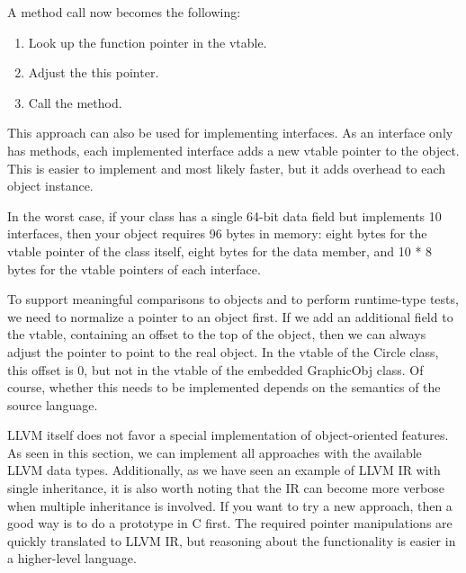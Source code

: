 
A method call now becomes the following:

\begin{enumerate}
\item
Look up the function pointer in the vtable.

\item
Adjust the this pointer.

\item
Call the method.
\end{enumerate}

This approach can also be used for implementing interfaces. As an interface only has methods, each implemented interface adds a new vtable pointer to the object. This is easier to implement and most likely faster, but it adds overhead to each object instance.

In the worst case, if your class has a single 64-bit data field but implements 10 interfaces, then your object requires 96 bytes in memory: eight bytes for the vtable pointer of the class itself, eight bytes for the data member, and 10 * 8 bytes for the vtable pointers of each interface.

To support meaningful comparisons to objects and to perform runtime-type tests, we need to normalize a pointer to an object first. If we add an additional field to the vtable, containing an offset to the top of the object, then we can always adjust the pointer to point to the real object. In the vtable of the Circle class, this offset is 0, but not in the vtable of the embedded GraphicObj class. Of course, whether this needs to be implemented depends on the semantics of the source language.

LLVM itself does not favor a special implementation of object-oriented features. As seen in this section, we can implement all approaches with the available LLVM data types. Additionally, as we have seen an example of LLVM IR with single inheritance, it is also worth noting that the IR can become more verbose when multiple inheritance is involved. If you want to try a new approach, then a good way is to do a prototype in C first. The required pointer manipulations are quickly translated to LLVM IR, but reasoning about the functionality is easier in a higher-level language.

